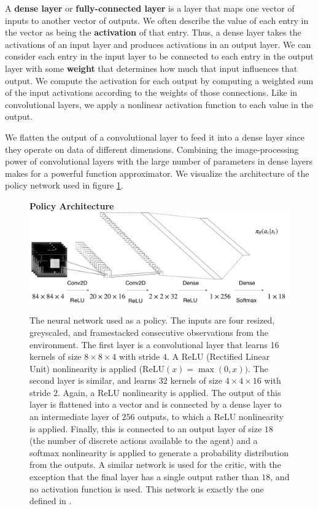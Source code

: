 \documentclass[journal, onecolumn, 12pt, draftclsnofoot]{IEEEtran}
\newcommand{\kword}[1]{\textbf{#1}}
\begin{document}
	\par A \kword{dense layer} or \kword{fully-connected layer} is a layer that maps one vector of inputs to another vector of outputs. We often describe the value of each entry in the vector as being the \kword{activation} of that entry. Thus, a dense layer takes the activations of an input layer and produces activations in an output layer. We can consider each entry in the input layer to be connected to each entry in the output layer with some \kword{weight} that determines how much that input influences that output. We compute the activation for each output by computing a weighted sum of the input activations according to the weights of those connections. Like in convolutional layers, we apply a nonlinear activation function to each value in the output.
	\par We flatten the output of a convolutional layer to feed it into a dense layer since they operate on data of different dimensions. Combining the image-processing power of convolutional layers with the large number of parameters in dense layers makes for a powerful function approximator. We visualize the architecture of the policy network used in figure \ref{fig:policy-architecture}.
	\begin{figure}
		\begin{center}
			\textbf{Policy Architecture} \\
		\includegraphics[scale=0.4]{fig/policy-architecture.pdf}
		\end{center}
		\caption{The neural network used as a policy. The inputs are four resized, greyscaled, and framestacked consecutive observations from the environment. The first layer is a convolutional layer that learns 16 kernels of size $8 \times 8 \times 4$ with stride $4$. A ReLU (Rectified Linear Unit) nonlinearity is applied ($\text{ReLU}(x) = \max (0, x))$. The second layer is similar, and learns $32$ kernels of size $4 \times 4 \times 16$ with stride $2$. Again, a ReLU nonlinearity is applied. The output of this layer is flattened into a vector and is connected by a dense layer to an intermediate layer of $256$ outputs, to which a ReLU nonlinearity is applied. Finally, this is connected to an output layer of size $18$ (the number of discrete actions available to the agent) and a softmax nonlinearity is applied to generate a probability distribution from the outputs. A similar network is used for the critic, with the exception that the final layer has a single output rather than $18$, and no activation function is used. This network is exactly the one defined in \cite{rnd}.}
		\label{fig:policy-architecture}
	\end{figure}
\end{document}
